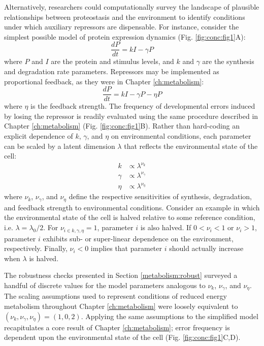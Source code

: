 Alternatively, researchers could computationally survey the landscape of plausible relationships between proteostasis and the environment to identify conditions under which auxiliary repressors are dispensable. For instance, consider the simplest possible model of protein expression dynamics (Fig. \ref{fig:conc:fig1}A):
\begin{equation}
\label{eq:simple_base}
\frac{dP}{dt} = kI - \gamma P
\end{equation}
where $P$ and $I$ are the protein and stimulus levels, and $k$ and $\gamma$ are the synthesis and degradation rate parameters. Repressors may be implemented as proportional feedback, as they were in Chapter \ref{ch:metabolism}:
\begin{equation}
\label{eq:simple_repressor}
\frac{dP}{dt} = kI - \gamma P - \eta P
\end{equation}
where $\eta$ is the feedback strength. The frequency of developmental errors induced by losing the repressor is readily evaluated using the same procedure described in Chapter \ref{ch:metabolism} (Fig. \ref{fig:conc:fig1}B). Rather than hard-coding an explicit dependence of $k$, $\gamma$, and $\eta$ on environmental conditions, each parameter can be scaled by a latent dimension $\lambda$ that reflects the environmental state of the cell:
\begin{equation}
\begin{aligned}
k &\propto \lambda^{\nu_k}  \\
\gamma &\propto \lambda^{\nu_{\gamma}}  \\
\eta &\propto \lambda^{\nu_{\eta}}
\end{aligned}
\label{eq:parameter_dependence}
\end{equation}
where $\nu_k$, $\nu_{\gamma}$, and $\nu_{\eta}$ define the respective sensitivities of synthesis, degradation, and feedback strength to environmental conditions. Consider an example in which the environmental state of the cell is halved relative to some reference condition, i.e. $\lambda = \lambda_{0} / 2$. For $\nu_{i \in {k,\gamma,\eta}} = 1$, parameter $i$ is also halved. If $0 < \nu_i < 1$ or $\nu_i > 1$, parameter $i$ exhibits sub- or super-linear dependence on the environment, respectively. Finally, $\nu_i < 0$ implies that parameter $i$ should actually increase when $\lambda$ is halved. 

The robustness checks presented in Section \ref{metabolism:robust} surveyed a handful of discrete values for the model parameters analogous to $\nu_k$, $\nu_{\gamma}$, and $\nu_{\eta}$. The scaling assumptions used to represent conditions of reduced energy metabolism throughout Chapter \ref{ch:metabolism} were loosely equivalent to $(\nu_k, \nu_{\gamma},\nu_{\eta}) = (1,0,2)$. Applying the same assumptions to the simplified model recapitulates a core result of Chapter \ref{ch:metabolism}; error frequency is dependent upon the environmental state of the cell (Fig. \ref{fig:conc:fig1}C,D).

